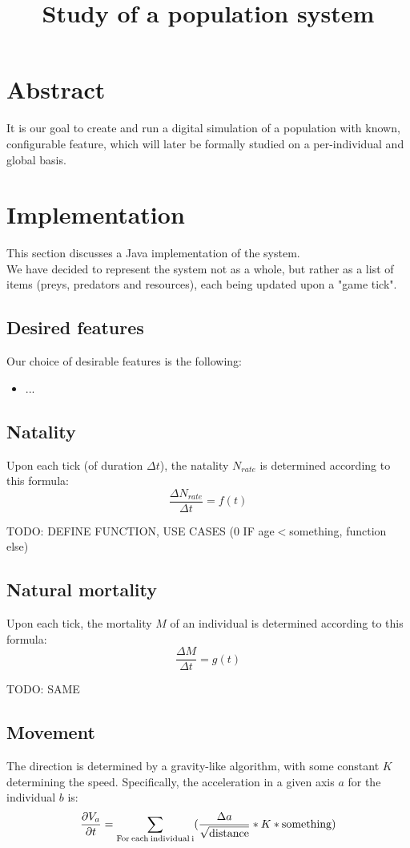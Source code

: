 \documentclass{article}
\title{Study of a population system}
\begin{document}
\maketitle

\section{Abstract}
It is our goal to create and run a digital simulation of a population with known, configurable feature, which will later be formally studied on a per-individual and global basis.

\section{Implementation}
This section discusses a Java implementation of the system.\\

We have decided to represent the system not as a whole, but rather as a list of items (preys, predators and resources), each being updated upon a "game tick".

\subsection{Desired features}
Our choice of desirable features is the following:
\begin{itemize}
\item ...
\end{itemize}

\subsection{Natality}
Upon each tick (of duration $\Delta t$), the natality $N_{rate}$ is determined according to this formula:
\[
\frac{\Delta N_{rate}}{\Delta t} = f(t)
\]

TODO: DEFINE FUNCTION, USE CASES (0 IF age$<$something, function else)

\subsection{Natural mortality}
Upon each tick, the mortality $M$ of an individual is determined according to this formula:
\[
\frac{\Delta M}{\Delta t} = g(t)
\]

TODO: SAME

\subsection{Movement}
The direction is determined by a gravity-like algorithm, with some constant $K$ determining the speed. Specifically, the acceleration in a given axis $a$ for the individual $b$ is:
\[
\frac{\partial V_a}{\partial t} = \sum_\text{For\:each\:individual\:i}(\frac{\Delta a}{\sqrt{\text{distance}}}*K*\text{something})
\]
\end{document}
